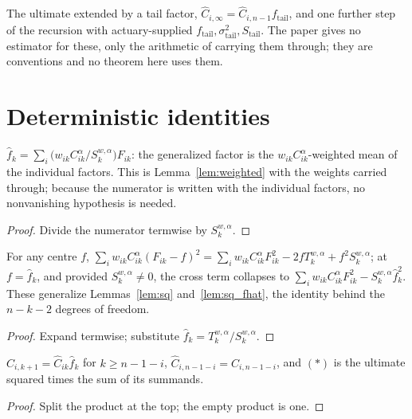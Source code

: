\begin{definition}\label{def:mwTail}\leanok
{}
The ultimate extended by a tail factor, $\hat C_{i,\infty} = \hat C_{i,n-1} f_{\mathrm{tail}}$,
and one further step of the recursion with actuary-supplied
$f_{\mathrm{tail}}, \sigma^2_{\mathrm{tail}}, S_{\mathrm{tail}}$. The paper gives no estimator
for these, only the arithmetic of carrying them through; they are conventions and no theorem
here uses them.
\end{definition}

\section{Deterministic identities}

\begin{lemma}\label{lem:mwWeighted}\leanok
{}
$\hat f_k = \sum_i \big(w_{ik} C_{ik}^{\alpha}/S_k^{w,\alpha}\big) F_{ik}$: the generalized
factor is the $w_{ik}C_{ik}^{\alpha}$-weighted mean of the individual factors. This is
Lemma~\ref{lem:weighted} with the weights carried through; because the numerator is written
with the individual factors, no nonvanishing hypothesis is needed.
\end{lemma}
\begin{proof}\leanok Divide the numerator termwise by $S_k^{w,\alpha}$. \end{proof}

\begin{lemma}\label{lem:mwSq}\leanok
{}
For any centre $f$,
$\sum_i w_{ik}C_{ik}^{\alpha}(F_{ik}-f)^2 = \sum_i w_{ik}C_{ik}^{\alpha}F_{ik}^2 - 2fT_k^{w,\alpha} + f^2 S_k^{w,\alpha}$;
at $f = \hat f_k$, and provided $S_k^{w,\alpha}\neq 0$, the cross term collapses to
$\sum_i w_{ik}C_{ik}^{\alpha}F_{ik}^2 - S_k^{w,\alpha}\hat f_k^2$. These generalize
Lemmas~\ref{lem:sq} and~\ref{lem:sq_fhat}, the identity behind the $n-k-2$ degrees of freedom.
\end{lemma}
\begin{proof}\leanok Expand termwise; substitute $\hat f_k = T_k^{w,\alpha}/S_k^{w,\alpha}$. \end{proof}

\begin{lemma}\label{lem:mwChat}\leanok
{}
$\hat C_{i,k+1} = \hat C_{ik}\hat f_k$ for $k \ge n-1-i$, $\hat C_{i,n-1-i} = C_{i,n-1-i}$, and
$(*)$ is the ultimate squared times the sum of its summands.
\end{lemma}
\begin{proof}\leanok Split the product at the top; the empty product is one. \end{proof}

